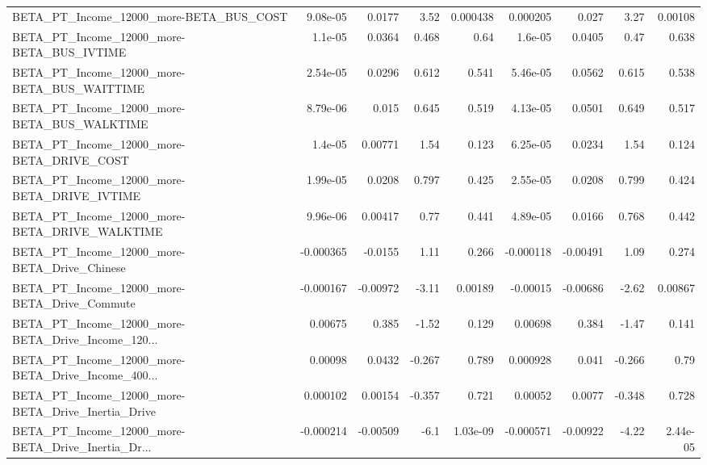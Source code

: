 \begin{tabular}{lrrrrrrrr}
BETA\_PT\_Income\_12000\_more-BETA\_BUS\_COST            &    9.08e-05 &       0.0177 &     3.52 & 0.000438 &   0.000205 &       0.027 &         3.27 &       0.00108 \\
BETA\_PT\_Income\_12000\_more-BETA\_BUS\_IVTIME          &     1.1e-05 &       0.0364 &    0.468 &     0.64 &    1.6e-05 &      0.0405 &         0.47 &         0.638 \\
BETA\_PT\_Income\_12000\_more-BETA\_BUS\_WAITTIME        &    2.54e-05 &       0.0296 &    0.612 &    0.541 &   5.46e-05 &      0.0562 &        0.615 &         0.538 \\
BETA\_PT\_Income\_12000\_more-BETA\_BUS\_WALKTIME        &    8.79e-06 &        0.015 &    0.645 &    0.519 &   4.13e-05 &      0.0501 &        0.649 &         0.517 \\
BETA\_PT\_Income\_12000\_more-BETA\_DRIVE\_COST          &     1.4e-05 &      0.00771 &     1.54 &    0.123 &   6.25e-05 &      0.0234 &         1.54 &         0.124 \\
BETA\_PT\_Income\_12000\_more-BETA\_DRIVE\_IVTIME        &    1.99e-05 &       0.0208 &    0.797 &    0.425 &   2.55e-05 &      0.0208 &        0.799 &         0.424 \\
BETA\_PT\_Income\_12000\_more-BETA\_DRIVE\_WALKTIME      &    9.96e-06 &      0.00417 &     0.77 &    0.441 &   4.89e-05 &      0.0166 &        0.768 &         0.442 \\
BETA\_PT\_Income\_12000\_more-BETA\_Drive\_Chinese       &   -0.000365 &      -0.0155 &     1.11 &    0.266 &  -0.000118 &    -0.00491 &         1.09 &         0.274 \\
BETA\_PT\_Income\_12000\_more-BETA\_Drive\_Commute       &   -0.000167 &     -0.00972 &    -3.11 &  0.00189 &   -0.00015 &    -0.00686 &        -2.62 &       0.00867 \\
BETA\_PT\_Income\_12000\_more-BETA\_Drive\_Income\_120... &     0.00675 &        0.385 &    -1.52 &    0.129 &    0.00698 &       0.384 &        -1.47 &         0.141 \\
BETA\_PT\_Income\_12000\_more-BETA\_Drive\_Income\_400... &     0.00098 &       0.0432 &   -0.267 &    0.789 &   0.000928 &       0.041 &       -0.266 &          0.79 \\
BETA\_PT\_Income\_12000\_more-BETA\_Drive\_Inertia\_Drive &    0.000102 &      0.00154 &   -0.357 &    0.721 &    0.00052 &      0.0077 &       -0.348 &         0.728 \\
BETA\_PT\_Income\_12000\_more-BETA\_Drive\_Inertia\_Dr... &   -0.000214 &     -0.00509 &     -6.1 & 1.03e-09 &  -0.000571 &    -0.00922 &        -4.22 &      2.44e-05 \\

\end{tabular}
